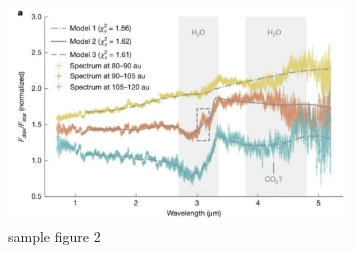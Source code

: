 \begin{figure}[H]
    \centering
    \includegraphics[width=0.8\textwidth,keepaspectratio]{utils/imgs/sample2.png}
    \caption{sample figure 2}
    \label{fig:sample_figure2}
\end{figure}